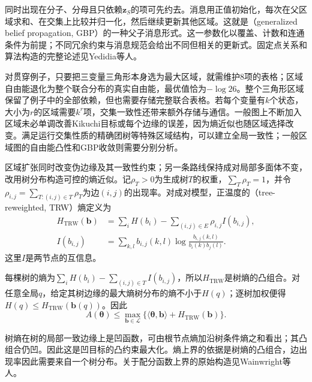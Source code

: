 同时出现在分子、分母且只依赖$\bm z_S$的项可先约去。消息用正值初始化，每次在父区域求和、在交集上比较并归一化，然后继续更新其他区域。这就是（generalized belief propagation, GBP）的一种父子消息形式。这一参数化以覆盖、计数和连通条件为前提；不同冗余约束与消息规范会给出不同但相关的更新式。固定点关系和算法构造的完整论述见Yedidia等人。

对贯穿例子，只要把三变量三角形本身选为最大区域，就需维护$8$项的表格；区域自由能退化为整个联合分布的真实自由能，最优值恰为$-\log26$。整个三角形区域保留了例子中的全部依赖，但也需要存储完整联合表格。若每个变量有$k$个状态，大小为$r$的区域需要$k^r$项，交集一致性还带来额外存储与通信。一般图上不断加入区域未必单调改善Kikuchi目标或每个边缘的误差，因为熵近似也随区域选择改变。满足运行交集性质的精确团树等特殊区域结构，可以建立全局一致性；一般区域图的自由能凸性和GBP收敛则需要分别分析。

区域扩张同时改变伪边缘及其一致性约束；另一条路线保持成对局部多面体不变，改用树分布构造可控的熵近似。记$\rho_T>0$为生成树$T$的权重，$\sum_T\rho_T=1$，并令$\rho_{i,j}=\sum_{T:(i,j)\in T}\rho_T$为边$(i,j)$的出现率。对成对模型，正温度的（tree-reweighted, TRW）熵定义为
\begin{equation}
  \begin{aligned}
    H_{\mathrm{TRW}}(\bm b)
      &=\sum_iH(b_i)-\sum_{(i,j)\in E}\rho_{i,j}I(b_{i,j}),\\
    I(b_{i,j})
      &=\sum_{k,l}b_{i,j}(k,l)
            \log\frac{b_{i,j}(k,l)}{b_i(k)b_j(l)}.
  \end{aligned}
  \label{eq:pgm-variational-trw-entropy}
\end{equation}
这里$I$是两节点的互信息。

每棵树的熵为$\sum_iH(b_i)-\sum_{(i,j)\in T}I(b_{i,j})$，所以$H_{\mathrm{TRW}}$是树熵的凸组合。对任意全局$q$，给定其树边缘的最大熵树分布的熵不小于$H(q)$；逐树加权便得$H(q)\leq H_{\mathrm{TRW}}(\bm b(q))$。因此
\begin{equation}
  A(\bm{\theta})\leq
    \max_{\bm b\in\mathcal L}
       \{\langle\bm{\theta},\bm b\rangle+H_{\mathrm{TRW}}(\bm b)\}.
  \label{eq:pgm-variational-trw-partition}
\end{equation}

树熵在树的局部一致边缘上是凹函数，可由根节点熵加沿树条件熵之和看出；其凸组合仍凹。因此这是凹目标的凸约束最大化。熵上界的依据是树熵的凸组合，边出现率因此需要来自一个树分布。关于配分函数上界的原始构造见Wainwright等人。

